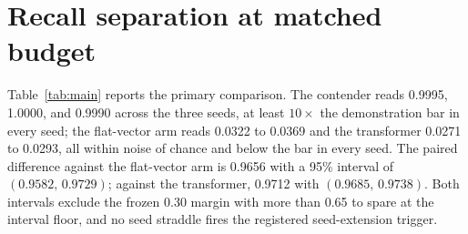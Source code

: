 \section{Recall separation at matched budget}
\label{sec:recall}

\begin{table}[t]
\centering
\small
\tableone
\caption{Episode-restricted recall accuracy on the primary cell ($K=32$,
$K/d=0.5$, binding span 224 tokens), per seed and mean, at the matched
final checkpoint (20{,}000 steps, identical data and optimizer; chance
$1/32 = 0.031$, demonstration bar $3/32 = 0.094$). The matrix fast-weight
model clears the bar in every seed; neither the parameter-matched
flat-vector recurrence nor the parameter-matched uncapped transformer ever
does. Both paired-seed 95\% $t$-intervals ($\mathrm{df}=2$) exclude the
pre-registered 0.30 margin. Accuracy is argmax-decoded and
episode-restricted, so it carries the capacity caveat of
Section~\ref{sec:setup}.}
\label{tab:main}
\end{table}

Table~\ref{tab:main} reports the primary comparison. The contender reads
0.9995, 1.0000, and 0.9990 across the three seeds, %
at least $10\times$ the demonstration bar in every seed; the flat-vector
arm reads 0.0322 to 0.0369 and the transformer 0.0271 to 0.0293, all
within noise of chance and below the bar in every
seed. %
The paired difference against the flat-vector arm is 0.9656 with a 95\%
interval of $(0.9582,\, 0.9729)$; against the transformer, 0.9712 with
$(0.9685,\, 0.9738)$. %
Both intervals exclude the frozen 0.30 margin with more than 0.65 to spare
at the interval floor, and no seed straddle fires the registered
seed-extension trigger. %

